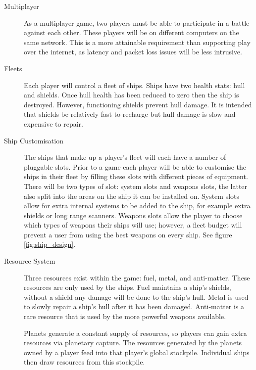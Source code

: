 \begin{description}

	\item[Multiplayer] As a multiplayer game, two players must be able to participate in a battle against each other.
	These players will be on different computers on the same network. This is a more attainable requirement than supporting play over the internet, as latency and packet loss issues will be less intrusive.

	\item[Fleets] Each player will control a fleet of ships. Ships have two health stats: hull and shields. Once hull health has been reduced to zero then the ship is destroyed. However, functioning shields prevent hull damage. It is intended that shields be relatively fast to recharge but hull damage is slow and expensive to repair.

	\item[Ship Customisation] The ships that make up a player's fleet will each have a number of pluggable slots. Prior to a game each player will be able to customise the ships in their fleet by filling these slots with different pieces of equipment. There will be two types of slot: system slots and weapons slots, the latter also split into the areas on the ship it can be installed on. System slots allow for extra internal systems to be added to the ship, for example extra shields or long range scanners. Weapons slots allow the player to choose which types of weapons their ships will use; however, a fleet budget will prevent a user from using the best weapons on every ship. See figure \ref{fig:ship_design}.

	\item[Resource System] Three resources exist within the game: fuel, metal, and anti-matter. These resources are only used by the ships. Fuel maintains a ship's shields, without a shield any damage will be done to the ship's hull. Metal is used to slowly repair a ship's hull after it has been damaged. Anti-matter is a rare resource that is used by the more powerful weapons available.

	Planets generate a constant supply of resources, so players can gain extra resources via planetary capture. The resources generated by the planets owned by a player feed into that player's global stockpile. Individual ships then draw resources from this stockpile.



\end{description}

